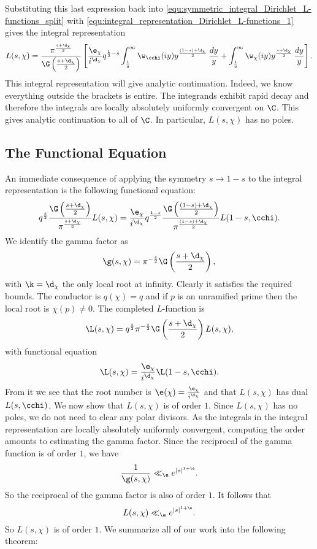      Substituting this last expression back into \cref{equ:symmetric_integral_Dirichlet_L-functions_split} with \cref{equ:integral_representation_Dirichlet_L-functions_1} gives the integral representation
      \[
        L(s,\chi) = \frac{\pi^{\frac{s+\d_{\chi}}{2}}}{\G\left(\frac{s+\d_{\chi}}{2}\right)}\left[\frac{\e_{\chi}}{i^{\d_{\chi}}}q^{\frac{1}{2}-s}\int_{\frac{1}{q}}^{\infty}\w_{\cchi}(iy)y^{\frac{(1-s)+\d_{\chi}}{2}}\,\frac{dy}{y}+\int_{\frac{1}{q}}^{\infty}\w_{\chi}(iy)y^{\frac{s+\d_{\chi}}{2}}\,\frac{dy}{y}\right].
      \]
      This integral representation will give analytic continuation. Indeed, we know everything outside the brackets is entire. The integrands exhibit rapid decay and therefore the integrals are locally absolutely uniformly convergent on $\C$. This gives analytic continuation to all of $\C$. In particular, $L(s,\chi)$ has no poles.
    \subsection*{The Functional Equation}
      An immediate consequence of applying the symmetry $s \to 1-s$ to the integral representation is the following functional equation:
      \[
        q^{\frac{s}{2}}\frac{\G\left(\frac{s+\d_{\chi}}{2}\right)}{\pi^{\frac{s+\d_{\chi}}{2}}}L(s,\chi) = \frac{\e_{\chi}}{i^{\d_{\chi}}}q^{\frac{1-s}{2}}\frac{\G\left(\frac{(1-s)+\d_{\chi}}{2}\right)}{\pi^{\frac{(1-s)+\d_{\chi}}{2}}}L(1-s,\cchi).
      \]
      We identify the gamma factor as
      \[
        \g(s,\chi) = \pi^{-\frac{s}{2}}\G\left(\frac{s+\d_{\chi}}{2}\right),
      \]
      with $\k = \d_{\chi}$ the only local root at infinity. Clearly it satisfies the required bounds. The conductor is $q(\chi) = q$ and if $p$ is an unramified prime then the local root is $\chi(p) \neq 0$. The completed $L$-function is
      \[
        \L(s,\chi) = q^{\frac{s}{2}}\pi^{-\frac{s}{2}}\G\left(\frac{s+\d_{\chi}}{2}\right)L(s,\chi),
      \]
      with functional equation
      \[
        \L(s,\chi) = \frac{\e_{\chi}}{i^{\d_{\chi}}}\L(1-s,\cchi).
      \]
      From it we see that the root number is $\e(\chi) = \frac{\e_{\chi}}{i^{\d_{\chi}}}$ and that $L(s,\chi)$ has dual $L(s,\cchi)$. We now show that $L(s,\chi)$ is of order $1$. Since $L(s,\chi)$ has no poles, we do not need to clear any polar divisors. As the integrals in the integral representation are locally absolutely uniformly convergent, computing the order amounts to estimating the gamma factor. Since the reciprocal of the gamma function is of order $1$, we have
      \[
        \frac{1}{\g(s,\chi)} \ll_{\e} e^{|s|^{1+\e}}.
      \]
      So the reciprocal of the gamma factor is also of order $1$. It follows that
      \[
        L(s,\chi) \ll_{\e} e^{|s|^{1+\e}}.
      \]
      So $L(s,\chi)$ is of order $1$. We summarize all of our work into the following theorem:

